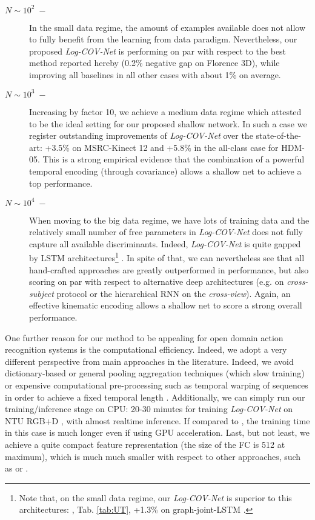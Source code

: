 \documentclass[10pt,twocolumn]{article}
\begin{document}
\begin{description}
	\item[$N \sim 10^2 \; - \;$] In the small data regime, the amount of examples available does not allow to fully benefit from the learning from data paradigm. Nevertheless, our proposed \textit{Log-COV-Net} is performing on par with respect to the best method reported hereby (0.2\% negative gap on Florence 3D), while improving all baselines in all other cases with about 1\% on average.
	\item[$N \sim 10^3 \; - \;$] Increasing by factor 10, we achieve a medium data regime which attested to be the ideal setting for our proposed shallow network. In such a case we register outstanding improvements of \textit{Log-COV-Net} over the state-of-the-art: +3.5\% on MSRC-Kinect 12 and +5.8\% in the all-class case for HDM-05. This is a strong empirical evidence that the combination of a powerful temporal encoding (through covariance) allows a shallow net to achieve a top performance.
	\item[$N \sim 10^4 \; - \;$] When moving to the big data regime, we have lots of training data and the relatively small number of free parameters in \textit{Log-COV-Net} does not fully capture all available discriminants. Indeed, \textit{Log-COV-Net} is quite gapped by LSTM architectures\footnote{Note that, on the small data regime, our \textit{Log-COV-Net} is superior to this architectures: \eg, Tab. \ref{tab:UT}, +1.3\% on graph-joint-LSTM \cite{Liu:ECCV16}.} \cite{Shahroudy:CVPR16,Liu:ECCV16}. In spite of that, we can nevertheless see that all hand-crafted approaches \cite{normal,Hnormal,H3DJ,quads,Vemulapalli:CVPR14} are greatly outperformed in performance, but also scoring on par with respect to alternative deep architectures (e.g. \cite{deeplie} on \textit{cross-subject} protocol or the hierarchical RNN on the \textit{cross-view}). Again, an effective kinematic encoding allows a shallow net to score a strong overall performance. 
\end{description}

One further reason for our method to be appealing for open domain action recognition systems is the computational efficiency. Indeed, we adopt a very different perspective from main approaches in the literature. Indeed, we avoid dictionary-based or general pooling aggregation techniques (which slow training) or expensive computational pre-processing such as temporal warping of sequences in order to achieve a fixed temporal length \cite{Vemulapalli:CVPR14,Vemulapalli:CVPR16}. Additionally, we can simply run our training/inference stage on CPU: 20-30 minutes for training \textit{Log-COV-Net} on NTU RGB+D \cite{Shahroudy:CVPR16}, with almost realtime inference. If compared to \cite{Shahroudy:CVPR16,Liu:ECCV16,deeplie,Du:CVPR15}, the training time in this case is much longer even if using GPU acceleration. Last, but not least, we achieve a quite compact feature representation (the size of the FC is 512 at maximum), which is much much smaller with respect to other approaches, such as \cite{ECCV16} or \cite{Vemulapalli:CVPR14}. 
	
\end{document}
